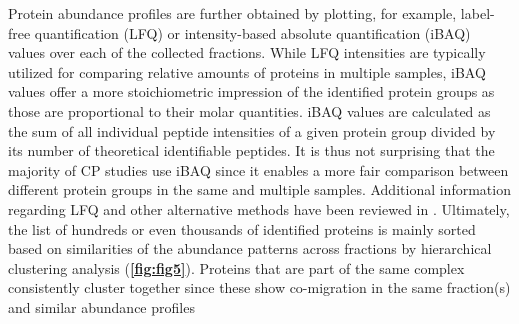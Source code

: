 Protein abundance profiles are further obtained by plotting, for example, label-free quantification (LFQ) \cite{Cox_2014} or intensity-based absolute quantification (iBAQ) \cite{Schwanhausser_2011, Tyanova_2016a} values over each of the collected fractions. While LFQ intensities are typically utilized for comparing relative amounts of proteins in multiple samples, iBAQ values offer a more stoichiometric impression of the identified protein groups as those are proportional to their molar quantities. iBAQ values are calculated as the sum of all individual peptide intensities of a given protein group divided by its number of theoretical identifiable peptides. It is thus not surprising that the majority of CP studies use iBAQ since it enables a more fair comparison between different protein groups in the same and multiple samples. Additional information regarding LFQ and other alternative methods have been reviewed in \cite{Fabre_2014, Wittig_2021}. Ultimately, the list of hundreds or even thousands of identified proteins is mainly sorted based on similarities of the abundance patterns across fractions by hierarchical clustering analysis (\textbf{\autoref{fig:fig5}}). Proteins that are part of the same complex consistently cluster together since these show co-migration in the same fraction(s) and similar abundance profiles

